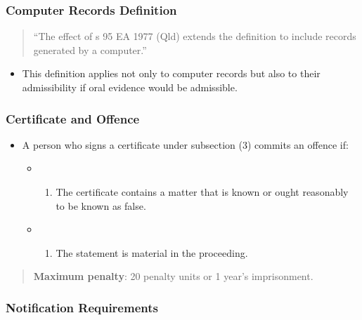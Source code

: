 \subsubsection{Computer Records
Definition}\label{computer-records-definition}

\begin{quote}
``The effect of s 95 EA 1977 (Qld) extends the definition to include
records generated by a computer.''
\end{quote}

\begin{itemize}
\tightlist
\item
  This definition applies not only to computer records but also to their
  admissibility if oral evidence would be admissible.
\end{itemize}

\subsubsection{Certificate and Offence}\label{certificate-and-offence}

\begin{itemize}
\tightlist
\item
  A person who signs a certificate under subsection (3) commits an
  offence if:

  \begin{itemize}
  \tightlist
  \item
    \begin{enumerate}
    \def\labelenumi{(\alph{enumi})}
    \tightlist
    \item
      The certificate contains a matter that is known or ought
      reasonably to be known as false.
    \end{enumerate}
  \item
    \begin{enumerate}
    \def\labelenumi{(\alph{enumi})}
    \setcounter{enumi}{1}
    \tightlist
    \item
      The statement is material in the proceeding.
    \end{enumerate}
  \end{itemize}
\end{itemize}

\begin{quote}
\textbf{Maximum penalty}: 20 penalty units or 1 year's imprisonment.
\end{quote}

\subsubsection{Notification
Requirements}\label{notification-requirements}

